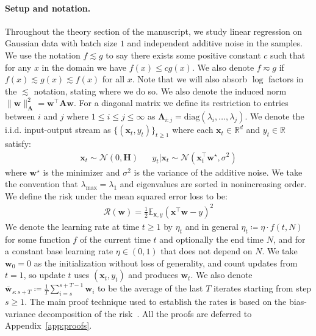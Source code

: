\documentclass{article}
\def\bw{\bar{\mathbf{w}}}
\def\x{{\mathbf{x}}}
\def\w{{\mathbf{w}}}
\def\H{{\mathbf{H}}}
\def\H{{\mathbf{H}}}
\def\risk{\mathcal{R}}
\def\diag{\text{diag}}
\def\LLambda{{\mathbf{\Lambda}}}
\def\N{\mathcal{N}}
\newcommand{\E}{\mathbb{E}}
\newcommand{\R}{\mathbb{R}}
\def\bw{\bar{\mathbf{w}}}
\def\x{{\mathbf{x}}}
\def\w{{\mathbf{w}}}
\def\H{{\mathbf{H}}}
\def\H{{\mathbf{H}}}
\def\risk{\mathcal{R}}
\def\LLambda{{\mathbf{\Lambda}}}
\def\N{\mathcal{N}}
\theoremstyle{plain}
\def\bw{\bar{\mathbf{w}}}
\def\x{{\mathbf{x}}}
\def\w{{\mathbf{w}}}
\def\H{{\mathbf{H}}}
\def\diag{{\text{diag}}}
\def\risk{\mathcal{R}}
\def\E{\mathbb{E}}
\def\LLambda{{\mathbf{\Lambda}}}
\def\N{\mathcal{N}}
\def\R{\mathbb{R}}
\begin{document}
\paragraph{Setup and notation.} Throughout the theory section of the manuscript, we study linear regression on Gaussian data with batch size $1$ and independent additive noise in the samples. We use the notation $f \lesssim g$ to say there exists some positive constant $c$ such that for any $x$ in the domain we have $f(x) \leq c g(x)$. We also denote $f \eqsim g$ if $f(x) \lesssim g(x) \lesssim f(x)$ for all $x$. Note that we will also absorb $\log$ factors in the $\lesssim$ notation, stating where we do so. We also denote the induced norm $\|\w\|_{\mathbf{A}}^2 = \w^\top \mathbf{A}\w$. For a diagonal matrix we define its restriction to entries between $i$ and $j$ where $1 \leq i \leq j \leq \infty$ as $\LLambda_{i:j} = \diag(\lambda_i, \dots, \lambda_j)$. We denote the i.i.d. input-output stream as $\{(\x_t, y_t)\}_{t\geq 1}$ where each $\x_t \in \R^d$ and $y_t \in \R$ satisfy:
\begin{align*}
    \x_t \sim \N(0, \H) && y_t|\x_t \sim \N(\x_t^\top \w^\star, \sigma^2)
\end{align*}
where $\w^\star$ is the minimizer and $\sigma^2$ is the variance of the additive noise. We take the convention that $\lambda_{\max} = \lambda_1$ and eigenvalues are sorted in nonincreasing order. We define the risk under the mean squared error loss to be:
\begin{align*}
    \risk(\w) = \frac{1}{2} \E_{\x, y}(\x^\top \w - y)^2
\end{align*}
We denote the learning rate at time $t\geq 1$ by $\eta_t$ and in general $\eta_t \coloneq \eta \cdot f(t, N)$ for some function $f$ of the current time $t$ and optionally the end time $N$, and for a constant base learning rate $\eta \in (0, 1)$ that does not depend on $N$. We take $\w_0=0$ as the initialization without loss of generality, and count updates from $t=1$, so update $t$ uses $(\x_t,y_t)$ and produces $\w_t$. We also denote $\bw_{s:s+T} \coloneq \frac{1}{T} \sum_{i=s}^{s+T-1} \w_i$ to be the average of the last $T$ iterates starting from step $s\geq1$. The main proof technique used to establish the rates is based on the bias-variance decomposition of the risk~\citep{jain2018parallelizing,jain2017markov,zou2023benign,wu2022last,wu2022power,meterez2025simplified}. All the proofs are deferred to Appendix~\ref{app:proofs}.
\end{document}
